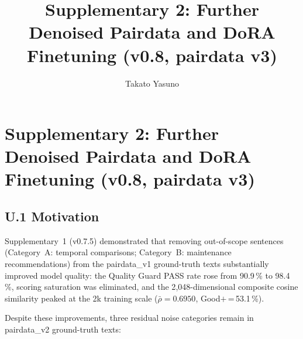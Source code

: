 \documentclass[onecolumn]{article}
\title{Supplementary 2: Further Denoised Pairdata and DoRA Finetuning (v0.8, pairdata v3)}
\author[1]{Takato Yasuno}
\date{}
\begin{document}
\renewcommand{\figurename}{Figure}
\renewcommand{\tablename}{Table}
\maketitle

\section*{Supplementary 2: Further Denoised Pairdata and DoRA Finetuning (v0.8, pairdata v3)}
\label{sec:supplementary2}

\subsection*{U.1 Motivation}

Supplementary~1 (v0.7.5) demonstrated that removing out-of-scope sentences
(Category~A: temporal comparisons; Category~B: maintenance recommendations)
from the pairdata\_v1 ground-truth texts substantially improved model quality:
the Quality Guard PASS rate rose from 90.9\,\% to 98.4\,\%, scoring saturation
was eliminated, and the 2{,}048-dimensional composite cosine similarity peaked
at the 2k training scale ($\bar{\rho}=0.6950$, Good$+$\,=\,53.1\,\%).

Despite these improvements, three residual noise categories remain in
pairdata\_v2 ground-truth texts:
\end{document}
